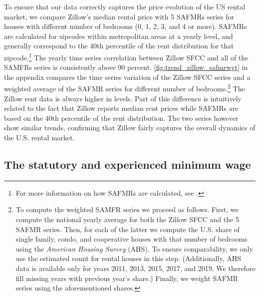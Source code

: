 To ensure that our data correctly captures the price evolution of the US rental market, 
we compare Zillow's median rental price with 5 SAFMRs series for houses with different 
number of bedrooms (0, 1, 2, 3, and 4 or more). SAFMRs are 
calculated for zipcodes within metropolitan areas at a yearly level, and generally correspond to 
the 40th percentile of the rent distribution for that zipcode.\footnote{For more 
	information on how SAFMRs are calculated, see \textcite[][page 41641]{hudPreamble}.} 
The yearly time series correlation between Zillow SFCC and all of the SAMFRs series is 
consistently above 90 percent. \autoref{fig:trend_zillow_safmrwgt} in the appendix 
compares the time series variation of the Zillow SFCC series and a weighted average of 
the SAFMR series for different number of bedrooms.\footnote{
	\label{foot:zillow_time_series}
	To compute the weighted SAMFR series we proceed as follows. First, we compute the 
	national yearly average for both the Zillow SFCC and the 5 	SAFMR series. Then, for 
	each of the latter we compute the U.S. share of single family, condo, and cooperative 
	houses with that number of bedrooms using the \textit{American Housing Survey} (AHS). 
	To ensure comparability, we only use the estimated count for rental houses in this 
	step. (Additionally, AHS data is available only for years 2011, 2013, 2015, 2017, and 
	2019. We therefore fill missing years with previous year's share.) Finally, we weight 
	SAFMR series using the aforementioned shares.} 
The Zillow rent data is always higher in levels. Part of this difference is intuitively 
related to the fact that Zillow reports median rent prices while SAFMRs are based on the 
40th percentile of the rent distribution. The two series however show similar trends, 
confirming that Zillow fairly captures the overall dynamics of the U.S. rental 
market.

\subsection{The statutory and experienced minimum wage}\label{sec:mw_construction}

